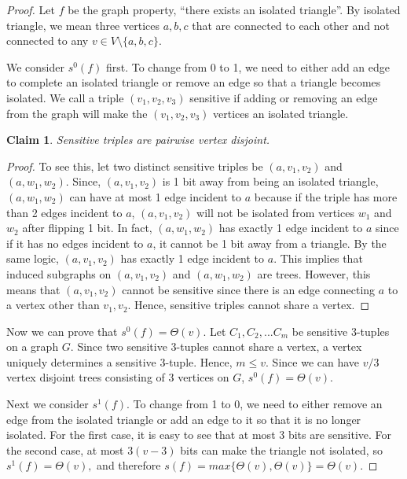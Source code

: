 \documentclass[psamsfonts]{amsart}
\newtheorem{claim}[theorem]{Claim}
\theoremstyle{definition}
\theoremstyle{remark}
\numberwithin{equation}{section}
\begin{document}
	\begin{proof}
		Let $f$ be the graph property, ``there exists an isolated triangle''. By isolated triangle, we mean three vertices $a,b,c$ that are connected to each other and not connected to any $v \in V\setminus\{a,b,c\}$.

		We consider $s^0(f)$ first. To change from 0 to 1, we need to either add an edge to complete an isolated triangle or remove an edge so that a triangle becomes isolated. We call a triple $(v_1,v_2,v_3)$ sensitive if adding or removing an edge from the graph will make the $(v_1,v_2,v_3)$ vertices an isolated triangle.

	\begin{claim}
		Sensitive triples are pairwise vertex disjoint. 
	\end{claim}
	\begin{proof}
		To see this, let two distinct sensitive triples be $(a,v_1,v_2)$ and $(a,w_1,w_2)$. Since, $(a,v_1,v_2)$ is 1 bit away from being an isolated triangle, $(a,w_1,w_2)$ can have at most 1 edge incident to $a$ because if the triple has more than 2 edges incident to $a$, $(a,v_1,v_2)$ will not be isolated from vertices $w_1$ and $w_2$ after flipping 1 bit. In fact, $(a,w_1,w_2)$ has exactly 1 edge incident to $a$ since if it has no edges incident to $a$, it cannot be 1 bit away from a triangle. By the same logic, $(a,v_1,v_2)$ has exactly 1 edge incident to $a$. This implies that induced subgraphs on $(a,v_1,v_2)$ and $(a,w_1,w_2)$ are trees. However, this means that $(a,v_1,v_2)$ cannot be sensitive since there is an edge connecting $a$ to a vertex other than $v_1,v_2$. Hence, sensitive triples cannot share a vertex. 
	\end{proof}

	Now we can prove that $s^0(f) = \Theta(v)$. Let $C_1, C_2, ... C_m$ be sensitive 3-tuples on a graph $G$. Since two sensitive 3-tuples cannot share a vertex, a vertex uniquely determines a sensitive 3-tuple. Hence, $m \leq v$. Since we can have $v/3$ vertex disjoint trees consisting of 3 vertices on $G$, $s^0(f) = \Theta(v)$.

	Next we consider $s^1(f)$. To change from 1 to 0, we need to either remove an edge from the isolated triangle or add an edge to it so that it is no longer isolated. For the first case, it is easy to see that at most 3 bits are sensitive. For the second case, at most $3(v-3)$ bits can make the triangle not isolated, so $s^1(f) = \Theta(v),$ and therefore $s(f) = max\{\Theta(v),\Theta(v)\}=\Theta(v)$.
	\end{proof}
\end{document}
